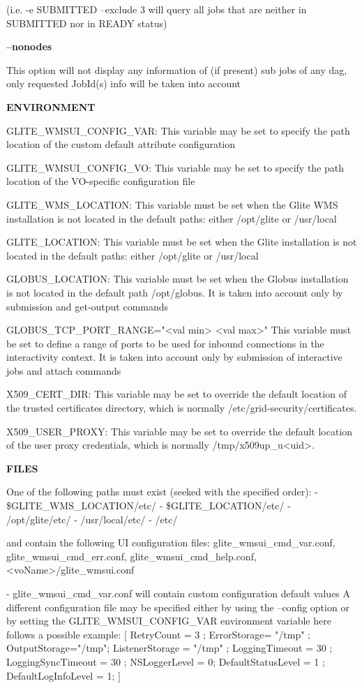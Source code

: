 {(i.e.  -e SUBMITTED --exclude 3  will query all jobs that are neither in SUBMITTED nor in READY status)

\textbf{--nonodes}

This option will not display any information of (if present) sub jobs of any dag, only requested JobId(s) info will be taken into account


\medskip
\textbf{ENVIRONMENT}
\smallskip


GLITE\_WMSUI\_CONFIG\_VAR:  This variable may be set to specify the path location of the custom default attribute configuration

GLITE\_WMSUI\_CONFIG\_VO: This variable may be set to specify the path location of the VO-specific configuration file

GLITE\_WMS\_LOCATION:  This variable must be set when the Glite WMS installation is not located in the default paths: either /opt/glite or /usr/local

GLITE\_LOCATION: This variable must be set when the Glite installation is not located in the default paths: either /opt/glite or /usr/local


GLOBUS\_LOCATION: This variable must be set when the Globus installation is not located in the default path /opt/globus.
It is taken into account only by submission and get-output commands

GLOBUS\_TCP\_PORT\_RANGE="<val min> <val max>" This variable must be set to define a range of ports to be used for inbound connections in the interactivity context.
It is taken into account only by submission of interactive jobs and attach commands

X509\_CERT\_DIR: This variable may be set to override the default location of the trusted certificates directory, which is normally /etc/grid-security/certificates.

X509\_USER\_PROXY: This variable may be set to override the default location of the user proxy credentials, which is normally /tmp/x509up\_u<uid>.

\medskip
\textbf{FILES}
\smallskip


One of the following paths must exist (seeked with the specified order):
- \$GLITE\_WMS\_LOCATION/etc/
- \$GLITE\_LOCATION/etc/
- /opt/glite/etc/
- /usr/local/etc/
- /etc/

and contain the following UI configuration files:
glite\_wmsui\_cmd\_var.conf, glite\_wmsui\_cmd\_err.conf, glite\_wmsui\_cmd\_help.conf, <voName>/glite\_wmsui.conf

- glite\_wmsui\_cmd\_var.conf will contain custom configuration default values
A different configuration file may be specified either by using the --config option or by setting the GLITE\_WMSUI\_CONFIG\_VAR environment variable
here follows a possible example:
[
RetryCount = 3 ;
ErrorStorage= "/tmp" ;
OutputStorage="/tmp";
ListenerStorage = "/tmp" ;
LoggingTimeout = 30 ;
LoggingSyncTimeout = 30 ;
NSLoggerLevel = 0;
DefaultStatusLevel = 1 ;
DefaultLogInfoLevel = 1;
]

}
